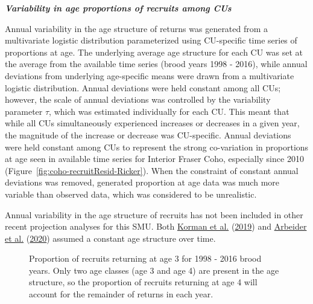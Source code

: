 \documentclass[11pt]{book}
\begin{document}
\textbf{\emph{Variability in age proportions of recruits among CUs}}

Annual variability in the age structure of returns was generated from a multivariate logistic distribution parameterized using CU-specific time series of proportions at age. The underlying average age structure for each CU was set at the average from the available time series (brood years 1998 - 2016), while annual deviations from underlying age-specific means were drawn from a multivariate logistic distribution. Annual deviations were held constant among all CUs; however, the scale of annual deviations was controlled by the variability parameter \(\tau\), which was estimated individually for each CU. This meant that while all CUs simultaneously experienced increases or decreases in a given year, the magnitude of the increase or decrease was CU-specific. Annual deviations were held constant among CUs to represent the strong co-variation in proportions at age seen in available time series for Interior Fraser Coho, especially since 2010 (Figure~\ref{fig:coho-recruitResid-Ricker}). When the constraint of constant annual deviations was removed, generated proportion at age data was much more variable than observed data, which was considered to be unrealistic.

Annual variability in the age structure of recruits has not been included in other recent projection analyses for this SMU. Both \protect\hyperlink{ref-kormanEvaluationFrameworkAssessing2019}{Korman et al.} (\protect\hyperlink{ref-kormanEvaluationFrameworkAssessing2019}{2019}) and \protect\hyperlink{ref-arbeiderInteriorFraserCoho2020}{Arbeider et al.} (\protect\hyperlink{ref-arbeiderInteriorFraserCoho2020}{2020}) assumed a constant age structure over time.
\begin{figure}[htb]

{\centering {} 

}

\caption{Proportion of recruits returning at age 3 for 1998 - 2016 brood years. Only two age classes (age 3 and age 4) are present in the age structure, so the proportion of recruits returning at age 4 will account for the remainder of returns in each year.}\label{fig:coho-ageProp}
\end{figure}
\linebreak
\end{document}
